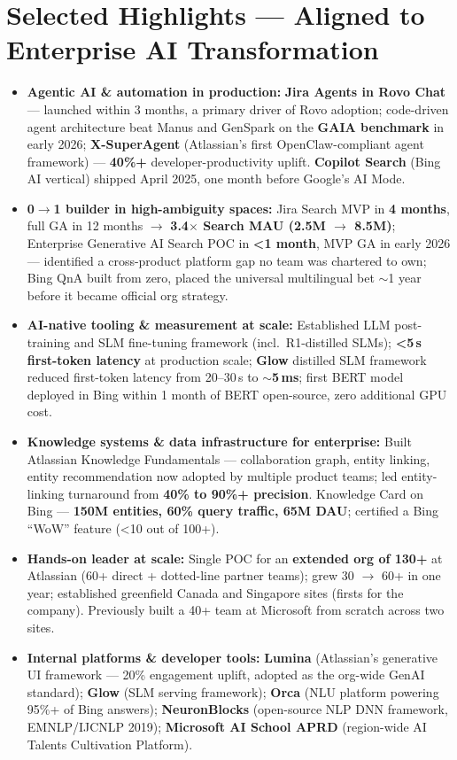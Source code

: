 \documentclass[10.5pt,letterpaper]{article}
\begin{document}
\section*{Selected Highlights --- Aligned to Enterprise AI Transformation}
\begin{itemize}
  \item \textbf{Agentic AI \& automation in production:} \textbf{Jira Agents in Rovo Chat} --- launched within 3 months, a primary driver of Rovo adoption; code-driven agent architecture beat Manus and GenSpark on the \textbf{GAIA benchmark} in early 2026; \textbf{X-SuperAgent} (Atlassian's first OpenClaw-compliant agent framework) --- \textbf{40\%+} developer-productivity uplift. \textbf{Copilot Search} (Bing AI vertical) shipped April 2025, one month before Google's AI Mode.
  \item \textbf{0$\to$1 builder in high-ambiguity spaces:} Jira Search MVP in \textbf{4 months}, full GA in 12 months $\to$ \textbf{3.4$\times$ Search MAU (2.5M $\to$ 8.5M)}; Enterprise Generative AI Search POC in \textbf{<1 month}, MVP GA in early 2026 --- identified a cross-product platform gap no team was chartered to own; Bing QnA built from zero, placed the universal multilingual bet $\sim$1 year before it became official org strategy.
  \item \textbf{AI-native tooling \& measurement at scale:} Established LLM post-training and SLM fine-tuning framework (incl.\ R1-distilled SLMs); \textbf{<5\,s first-token latency} at production scale; \textbf{Glow} distilled SLM framework reduced first-token latency from 20--30\,s to \textbf{$\sim$5\,ms}; first BERT model deployed in Bing within 1 month of BERT open-source, zero additional GPU cost.
  \item \textbf{Knowledge systems \& data infrastructure for enterprise:} Built Atlassian Knowledge Fundamentals --- collaboration graph, entity linking, entity recommendation now adopted by multiple product teams; led entity-linking turnaround from \textbf{40\% to 90\%+ precision}. Knowledge Card on Bing --- \textbf{150M entities, 60\% query traffic, 65M DAU}; certified a Bing ``WoW'' feature (<10 out of 100+).
  \item \textbf{Hands-on leader at scale:} Single POC for an \textbf{extended org of 130+} at Atlassian (60+ direct + dotted-line partner teams); grew 30 $\to$ 60+ in one year; established greenfield Canada and Singapore sites (firsts for the company). Previously built a 40+ team at Microsoft from scratch across two sites.
  \item \textbf{Internal platforms \& developer tools:} \textbf{Lumina} (Atlassian's generative UI framework --- 20\% engagement uplift, adopted as the org-wide GenAI standard); \textbf{Glow} (SLM serving framework); \textbf{Orca} (NLU platform powering 95\%+ of Bing answers); \textbf{NeuronBlocks} (open-source NLP DNN framework, EMNLP/IJCNLP 2019); \textbf{Microsoft AI School APRD} (region-wide AI Talents Cultivation Platform).

\end{itemize}
\end{document}
